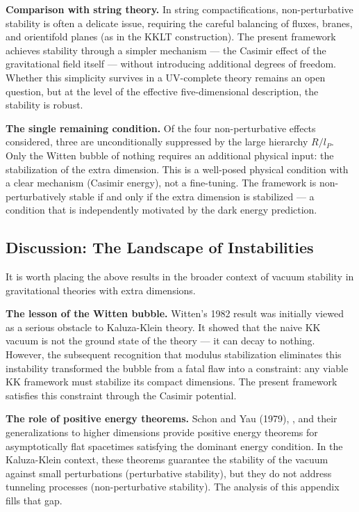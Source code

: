 \documentclass[aps,prd,preprint,superscriptaddress,longbibliography,floatfix]{revtex4-2}
\theoremstyle{remark}
\begin{document}
\textbf{Comparison with string theory.} In string compactifications, non-perturbative stability is often a delicate issue, requiring the careful balancing of fluxes, branes, and orientifold planes (as in the KKLT construction). The present framework achieves stability through a simpler mechanism --- the Casimir effect of the gravitational field itself --- without introducing additional degrees of freedom. Whether this simplicity survives in a UV-complete theory remains an open question, but at the level of the effective five-dimensional description, the stability is robust.

\textbf{The single remaining condition.} Of the four non-perturbative effects considered, three are unconditionally suppressed by the large hierarchy $R/l_P$. Only the Witten bubble of nothing requires an additional physical input: the stabilization of the extra dimension. This is a well-posed physical condition with a clear mechanism (Casimir energy), not a fine-tuning. The framework is non-perturbatively stable if and only if the extra dimension is stabilized --- a condition that is independently motivated by the dark energy prediction.



\subsection{Discussion: The Landscape of Instabilities}

It is worth placing the above results in the broader context of vacuum stability in gravitational theories with extra dimensions.

\textbf{The lesson of the Witten bubble.} Witten's 1982 result was initially viewed as a serious obstacle to Kaluza-Klein theory. It showed that the naive KK vacuum is not the ground state of the theory --- it can decay to nothing. However, the subsequent recognition that modulus stabilization eliminates this instability transformed the bubble from a fatal flaw into a constraint: any viable KK framework must stabilize its compact dimensions. The present framework satisfies this constraint through the Casimir potential.

\textbf{The role of positive energy theorems.} Schon and Yau (1979), \cite{Witten1981}, and their generalizations to higher dimensions provide positive energy theorems for asymptotically flat spacetimes satisfying the dominant energy condition. In the Kaluza-Klein context, these theorems guarantee the stability of the vacuum against small perturbations (perturbative stability), but they do not address tunneling processes (non-perturbative stability). The analysis of this appendix fills that gap.
\end{document}
